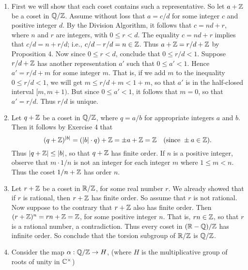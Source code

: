 \begin{enumerate}
      \begin{enumerate}
         \item First we will show that each coset contains such a
               representative. So let $a + \mathbb{Z}$ be a coset in $\mathbb{Q}/\mathbb{Z}$. Assume 
               without loss that $a = c/d$ for some integer $c$ and positive 
               integer $d$. By the Division Algorithm, it follows that
               $c = nd + r$, where $n$ and $r$ are integers, with $0 \le r < d$. 
               The equality $c = nd + r$ implies that $c/d = n + r/d$; i.e.,
               $c/d - r/d = n \in \mathbb{Z}$. Thus $a + \mathbb{Z} = r/d + \mathbb{Z}$ by Proposition
               4. Now since $0 \le r < d$, conclude that $0 \le r/d < 1$.
               Suppose $r/d + \mathbb{Z}$ has another representation $a'$ such that
               $0 \le a' < 1$. Hence $a' = r/d + m$ for some integer $m$. That
               is, if we add $m$ to the inequality $0 \le r/d < 1$, we will get 
               $m \le r/d + m < 1 + m$, so that $a'$ is in the half-closed
               interval $[m,  m + 1)$. But since $0 \le a' < 1$, it follows that
               $m = 0$, so that $a' = r/d$. Thus $r/d$ is unique.
         \item Let $q + \mathbb{Z}$ be a coset in $\mathbb{Q}/\mathbb{Z}$, where $q = a/b$ for 
               appropriate integers $a$ and $b$. Then it follows by Exercise
               4 that
               $$(q + \mathbb{Z})^{|b|} = (|b|\cdot q) + \mathbb{Z} = \pm a + \mathbb{Z} = \mathbb{Z}
                  \quad(\text{since } \pm a \in \mathbb{Z}).$$
               Thus $|q + \mathbb{Z}| \le |b|$, so that $q + \mathbb{Z}$ has finite order. If
               $n$ is a positive integer, observe that $m \cdot 1/n$ is not an
               integer for each integer $m$ where $1 \le m < n$. Thus the coset
               $1/n + \mathbb{Z}$ has order $n$.
         \item Let $r + \mathbb{Z}$ be a coset in $\mathbb{R}/\mathbb{Z}$, for some real number $r$. We
               already showed that if $r$ is rational, then $r + \mathbb{Z}$ has finite
               order. So assume that $r$ is not rational. Now suppose to the
               contrary that $r + \mathbb{Z}$ also has finite order. Then 
               $(r + \mathbb{Z})^n = rn + \mathbb{Z} = \mathbb{Z}$, for some positive integer $n$. That
               is, $rn \in \mathbb{Z}$, so that $r$ is a rational number, a
               contradiction. Thus every coset in $(\mathbb{R} - \mathbb{Q})/\mathbb{Z}$ has infinite
               order. So conclude that the torsion subgroup of $\mathbb{R}/\mathbb{Z}$ is
               $\mathbb{Q}/\mathbb{Z}$.
         \item Consider the map $\alpha : \mathbb{Q}/\mathbb{Z} \rightarrow H$, (where $H$ is
               the multiplicative group of roots of unity in $\mathbb{C}^\times$)

\end{enumerate}
\end{enumerate}
